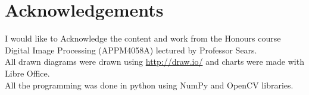 \documentclass[a4paper]{article}
\begin{document}
\section*{Acknowledgements}
I would like to Acknowledge the content and work from the Honours course Digital Image Processing (APPM4058A) lectured by Professor Sears. \\
All drawn diagrams were drawn using \url{http://draw.io/} and charts were made with Libre Office.\\ 
All the programming was done in python using NumPy and OpenCV libraries.\\



{}
\end{document}

